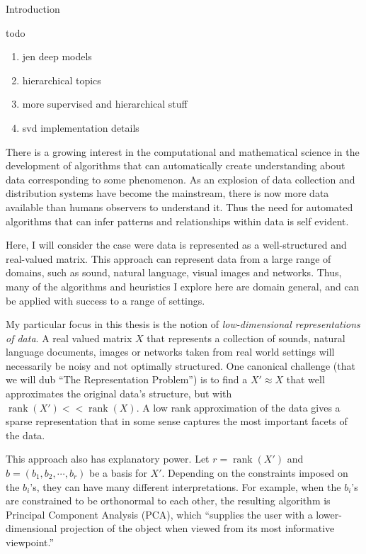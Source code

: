 \documentclass[12pt]{pom_thesis}
\begin{document}
\begin{chapter}{Introduction}
	
	todo
	\begin{enumerate}
		\item jen deep models
		\item hierarchical topics
		\item more supervised and hierarchical stuff
		\item svd implementation details
	\end{enumerate}
	There is a growing interest in the computational and mathematical science in the development of algorithms that can automatically create understanding about data corresponding to some phenomenon. As an explosion of data collection and distribution systems have become the mainstream, there is now more data available than humans observers to understand it. Thus the need for automated algorithms that can infer patterns and relationships within data is self evident. 
	
	Here, I will consider the case were data is represented as a well-structured and  real-valued matrix. This approach can represent data from a large range of domains, such as sound, natural language, visual images and networks. Thus, many of the algorithms and heuristics I explore here are domain general, and can be applied with success to a range of settings. 
	
	My particular focus in this thesis is the notion of \textit{low-dimensional representations of data}. A real valued matrix $X$ that represents a collection of sounds, natural language documents, images or networks taken from real world settings will necessarily be noisy and not optimally structured. One canonical challenge (that we will dub ``The Representation Problem'') is to find a $X' \approx X$ that well approximates the original data's structure, but with $\operatorname{rank}(X') << \operatorname{rank}(X)$. A low rank approximation of the data gives a sparse representation that in some sense captures the most important facets of the data. 
	
	This approach also has explanatory power. Let $r = \operatorname{rank}(X')$ and $b= (b_1,b_2,\cdots,b_r)$ be a basis for $X'$. Depending on the constraints imposed on the $b_i$'s, they can have many different interpretations. For example, when the $b_i$'s are constrained to be orthonormal to each other, the resulting algorithm is Principal Component Analysis (PCA), which ``supplies the user with a lower-dimensional projection of the object when viewed from its most informative viewpoint.'' 
	

\end{chapter}
\end{document}
